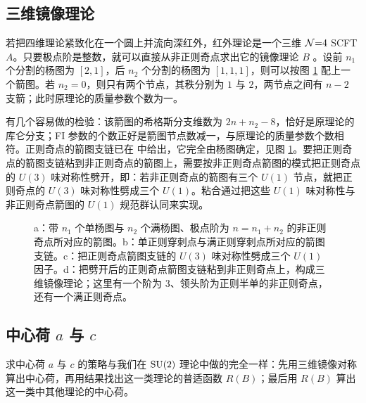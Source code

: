 \subsection{三维镜像理论}
\label{sec:5.2}

若把四维理论紧致化在一个圆上并流向深红外，红外理论是一个三维 $\mathcal{N}{=}4$ SCFT $A$。只要极点阶是整数，就可以直接从非正则奇点求出它的镜像理论 $B$ \cite{44}。设前 $n_1$ 个分割的杨图为 $[2,1]$，后 $n_2$ 个分割的杨图为 $[1,1,1]$，则可以按图 \ref{fig:10} 配上一个箭图。若 $n_2=0$，则只有两个节点，其秩分别为 $1$ 与 $2$，两节点之间有 $n-2$ 支箭；此时原理论的质量参数个数为一。

有几个容易做的检验：该箭图的希格斯分支维数为 $2n+n_2-8$，恰好是原理论的库仑分支；FI 参数的个数正好是箭图节点数减一，与原理论的质量参数个数相符。正则奇点的箭图支链已在 \cite{38} 中给出，它完全由杨图确定，见图 \ref{fig:10}。要把正则奇点的箭图支链粘到非正则奇点的箭图上，需要按非正则奇点箭图的模式把正则奇点的 $U(3)$ 味对称性劈开，即：若非正则奇点的箭图有三个 $U(1)$ 节点，就把正则奇点的 $U(3)$ 味对称性劈成三个 $U(1)$。粘合通过把这些 $U(1)$ 味对称性与非正则奇点箭图的 $U(1)$ 规范群认同来实现。

\begin{figure}[tbp]
\centering

\caption{a：带 $n_1$ 个单杨图与 $n_2$ 个满杨图、极点阶为 $n=n_1+n_2$ 的非正则奇点所对应的箭图。b：单正则穿刺点与满正则穿刺点所对应的箭图支链。c：把正则奇点箭图支链的 $U(3)$ 味对称性劈成三个 $U(1)$ 因子。d：把劈开后的正则奇点箭图支链粘到非正则奇点上，构成三维镜像理论；这里有一个阶为 $3$、领头阶为正则半单的非正则奇点，还有一个满正则奇点。}
\label{fig:10}
\end{figure}

\subsection{中心荷 $a$ 与 $c$}
\label{sec:5.3}

求中心荷 $a$ 与 $c$ 的策略与我们在 $\operatorname{SU}(2)$ 理论中做的完全一样：先用三维镜像对称算出中心荷，再用结果找出这一类理论的普适函数 $R(B)$；最后用 $R(B)$ 算出这一类中其他理论的中心荷。

